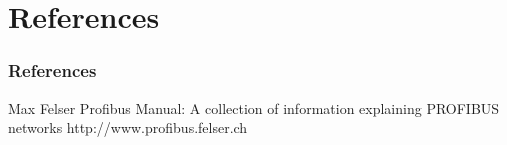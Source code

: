 \documentclass{beamer}
\begin{document}
\section*{References}
\begin{frame}[allowframebreaks]
  \frametitle{References}
  \begin{thebibliography}{10}
  \beamertemplatebookbibitems
    Max Felser
    \newblock Profibus Manual: A collection of information explaining PROFIBUS networks
    \newblock http://www.profibus.felser.ch
   \end{thebibliography}
 \end{frame}
\end{document}
